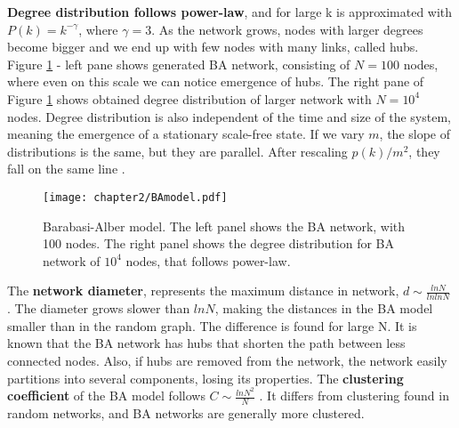 \textbf{Degree distribution follows power-law}, and for large k is approximated with $P(k) = k^{-\gamma}$, where $\gamma=3$. As the network grows, nodes with larger degrees become bigger and we end up with few nodes with many links, called hubs. Figure \ref{fig:bamodel} - left pane shows generated BA network, consisting of $N=100$ nodes, where even on this scale we can notice emergence of hubs. The right pane of Figure \ref{fig:bamodel} shows obtained degree distribution of larger network with $N=10^4$ nodes. Degree distribution is also independent of the time and size of the system, meaning the emergence of a stationary scale-free state.  If we vary $m$, the slope of distributions is the same, but they are parallel. After rescaling $p(k)/m^2$, they fall on the same line \cite{barabasi2016network}.  

\begin{figure}[h]
	\centering
	\texttt{[image: chapter2/BAmodel.pdf]}
	\caption[Barabasi-Albert model]{Barabasi-Alber model. The left panel shows the BA network, with 100 nodes. The right panel shows the degree distribution for BA network of $10^4$ nodes, that follows power-law.}
	\label{fig:bamodel}
\end{figure}


 
The \textbf{network diameter}, represents the maximum distance in network, $d \sim \frac{lnN}{lnlnN}$ \cite{bollobas2003mathematical}. The diameter grows slower than $lnN$, making the distances in the BA model smaller than in the random graph. The difference is found for large N. It is known that the BA network has hubs that shorten the path between less connected nodes. Also, if hubs are removed from the network, the network easily partitions into several components, losing its properties. The \textbf{clustering coefficient} of the BA model follows $C \sim \frac{ln N^2}{N}$ \cite{bollobas2003mathematical}. It differs from clustering found in random networks, and BA networks are generally more clustered. 

